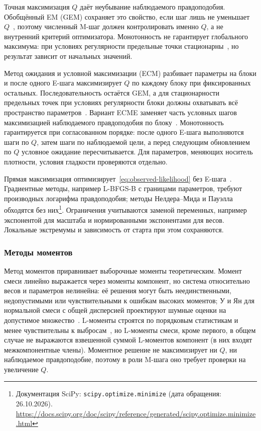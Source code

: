 Точная максимизация $Q$ даёт неубывание наблюдаемого правдоподобия. Обобщённый EM (GEM) сохраняет это свойство, если шаг лишь не уменьшает $Q$~\cite{Dempster1977}, поэтому численный M-шаг должен контролировать именно $Q$, а не внутренний критерий оптимизатора. Монотонность не гарантирует глобального максимума: при условиях регулярности предельные точки стационарны~\cite{Wu1983}, но результат зависит от начальных значений.

Метод ожидания и условной максимизации (ECM) разбивает параметры на блоки и после одного E-шага максимизирует $Q$ по каждому блоку при фиксированных остальных. Последовательность остаётся GEM, а для стационарности предельных точек при условиях регулярности блоки должны охватывать всё пространство параметров~\cite{MengRubin1993}. Вариант ECME заменяет часть условных шагов максимизацией наблюдаемого правдоподобия по блоку~\cite{LiuRubin1994}. Монотонность гарантируется при согласованном порядке: после одного E-шага выполняются шаги по $Q$, затем шаги по наблюдаемой цели, а перед следующим обновлением по $Q$ условное ожидание пересчитывается. Для параметров, меняющих носитель плотности, условия гладкости проверяются отдельно.

Прямая максимизация оптимизирует~\eqref{eq:observed-likelihood} без E-шага~\cite{RednerWalker1984}. Градиентные методы, например L-BFGS-B с границами параметров, требуют производных логарифма правдоподобия; методы Нелдера--Мида и Пауэлла обходятся без них\footnote{Документация SciPy: \texttt{scipy.optimize.minimize} (дата обращения: 26.10.2026). \url{https://docs.scipy.org/doc/scipy/reference/generated/scipy.optimize.minimize.html}}. Ограничения учитываются заменой переменных, например экспонентой для масштаба и нормированными экспонентами для весов. Локальные экстремумы и зависимость от старта при этом сохраняются.

\subsubsection{Методы моментов}

Метод моментов приравнивает выборочные моменты теоретическим. Момент смеси линейно выражается через моменты компонент, но система относительно весов и параметров нелинейна: её решения могут быть неединственными, недопустимыми или чувствительными к ошибкам высоких моментов; У и Ян для нормальной смеси с общей дисперсией проектируют шумные оценки на допустимое множество~\cite{WuYang2020}. L-моменты строятся по порядковым статистикам и менее чувствительны к выбросам~\cite{Hosking1990}, но L-моменты смеси, кроме первого, в общем случае не выражаются взвешенной суммой L-моментов компонент (в них входят межкомпонентные члены). Моментное решение не максимизирует ни $Q$, ни наблюдаемое правдоподобие, поэтому в роли M-шага оно требует проверки на увеличение $Q$.

